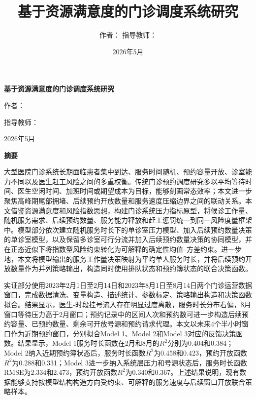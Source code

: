 \documentclass[a4paper,zihao=-4]{ctexart}
\title{\bfseries 基于资源满意度的门诊调度系统研究}
\author{作者：\underline{\hspace{3cm}} \quad 指导教师：\underline{\hspace{3cm}}}
\date{2026年5月}
\numberwithin{figure}{section}
\numberwithin{table}{section}
\begin{document}
\begin{titlepage}
  \thispagestyle{empty}
  \centering
  \vspace*{3cm}
  {\bfseries 基于资源满意度的门诊调度系统研究\par}
  \vspace{4cm}
  {作者：\underline{\hspace{4cm}}\par}
  \vspace{1cm}
  {指导教师：\underline{\hspace{4cm}}\par}
  \vfill
  {2026年5月\par}
\end{titlepage}

\setcounter{page}{1}
\tableofcontents
\clearpage

{}
\begin{center}
{\bfseries 摘要}
\end{center}

大型医院门诊系统长期面临患者集中到达、服务时间随机、预约容量开放、诊室能力不同以及医生赶工风险之间的多重权衡。传统门诊预约调度研究多以平均等待时间、医生空闲时间、加班时间或期望成本为目标，能够刻画常态效率；本文进一步聚焦高峰期尾部拥堵、后续预约开放数量和服务速度压缩边界之间的联动关系。本文借鉴资源满意度和风险指数思想，构建门诊系统压力指标原型，将候诊工作量、随机服务需求、后续预约数量、服务能力释放和赶工惩罚统一到同一风险度量框架中。模型部分依次建立随机服务时长下的单诊室压力模型、加入后续预约数量决策的单诊室模型，以及保留多诊室可行分流并加入后续预约数量决策的协同模型，并在正态近似下将指数型风险约束转化为可解释的确定性均值--方差约束。进一步地，本文将模型输出的服务工作量决策映射为平均单人服务时长，并将后续预约开放数量作为并列策略输出，构造同时使用排队状态和预约簿状态的联合决策函数。

实证部分使用2023年2月1日至2月14日和2023年8月1日至8月14日两个门诊运营数据窗口，完成数据清洗、变量构造、描述统计、参数标定、策略输出构造和决策函数拟合。结果显示，医生-时段挂号流入存在明显过度离散，服务时长分布右偏，8月窗口等待压力高于2月窗口；预约记录中的区间人次和预约数可进一步构造后续预约容量、已预约数量、剩余可开放号源和预约请求代理。本文以未来4个半小时窗口作为近期预约窗口，分别拟合Model 1、Model 2和Model 3对应的反馈决策函数。结果显示，Model 1服务时长函数在2月和8月的$R^2$分别为0.404和0.384；Model 2纳入近期预约簿状态后，服务时长函数$R^2$为0.458和0.423，预约开放函数$R^2$为0.288和0.331；Model 3进一步纳入系统层压力和号源状态后，服务时长函数RMSE为2.334和2.473，预约开放函数$R^2$为0.340和0.367。上述结果说明，现有数据能够支持按模型结构构造方向受约束、可解释的服务速度与后续窗口开放联合策略样本。
\end{document}
